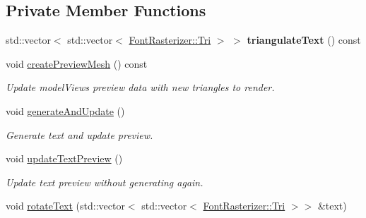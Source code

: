 \subsection*{Private Member Functions}
\begin{DoxyCompactItemize}
\item 
\mbox{\label{classpepr3d_1_1_text_editor_a3ef1d677128a8c5d745bddb9f2e00119}} 
std\+::vector$<$ std\+::vector$<$ \mbox{\hyperlink{structpepr3d_1_1_font_rasterizer_1_1_tri}{Font\+Rasterizer\+::\+Tri}} $>$ $>$ {\bfseries triangulate\+Text} () const
\item 
\mbox{\label{classpepr3d_1_1_text_editor_a8e848393dc43187cfe5e89833fc61a91}} 
void \mbox{\hyperlink{classpepr3d_1_1_text_editor_a8e848393dc43187cfe5e89833fc61a91}{create\+Preview\+Mesh}} () const
\begin{DoxyCompactList}\small\item\em Update model\+View\textquotesingle{}s preview data with new triangles to render. \end{DoxyCompactList}\item 
\mbox{\label{classpepr3d_1_1_text_editor_a4d708589412de7f0bf3c0bd0a76efe9c}} 
void \mbox{\hyperlink{classpepr3d_1_1_text_editor_a4d708589412de7f0bf3c0bd0a76efe9c}{generate\+And\+Update}} ()
\begin{DoxyCompactList}\small\item\em Generate text and update preview. \end{DoxyCompactList}\item 
\mbox{\label{classpepr3d_1_1_text_editor_a6215bc1584a7ec5a7591f286f153891b}} 
void \mbox{\hyperlink{classpepr3d_1_1_text_editor_a6215bc1584a7ec5a7591f286f153891b}{update\+Text\+Preview}} ()
\begin{DoxyCompactList}\small\item\em Update text preview without generating again. \end{DoxyCompactList}\item 
\mbox{\label{classpepr3d_1_1_text_editor_a811d714a58f7f3cc06d271fc1e3b223f}} 
void \mbox{\hyperlink{classpepr3d_1_1_text_editor_a811d714a58f7f3cc06d271fc1e3b223f}{rotate\+Text}} (std\+::vector$<$ std\+::vector$<$ \mbox{\hyperlink{structpepr3d_1_1_font_rasterizer_1_1_tri}{Font\+Rasterizer\+::\+Tri}} $>$$>$ \&text)
$$
\end{DoxyCompactItemize}
